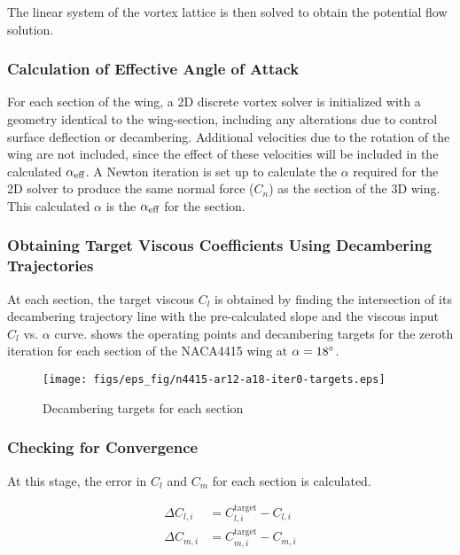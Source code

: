The linear system of the vortex lattice is then solved to obtain the potential flow solution.

\subsubsection{Calculation of Effective Angle of Attack}\label{step:aeff-calc}
For each section of the wing, a 2D discrete vortex solver is initialized with a geometry identical to the wing-section, including any alterations due to control surface deflection or decambering. Additional velocities due to the rotation of the wing are not included, since the effect of these velocities will be included in the calculated $\alpha_\text{eff}{}$.
A Newton iteration is set up to calculate the $\alpha$ required for the 2D solver to produce the same normal force ($C_n$) as the section of the 3D wing. This calculated $\alpha$ is the $\alpha_\text{eff}{}$ for the section.

\subsubsection{Obtaining Target Viscous Coefficients Using Decambering Trajectories}\label{step:traj-target}
At each section, the target viscous $C_l$ is obtained by finding the intersection of its decambering trajectory line with the pre-calculated slope and the viscous input $C_l$ vs. $\alpha$ curve.  shows the operating points and decambering targets for the zeroth iteration for each section of the NACA4415  wing at $\alpha=18^\circ{}$.

\begin{figure}[ht]
    \centering
    \texttt{[image: figs/eps\_fig/n4415-ar12-a18-iter0-targets.eps]}
    \caption{Decambering targets for each section}
    \label{fig:iter0-targets}
\end{figure}


\subsubsection{Checking for Convergence}\label{step:convergence}
At this stage, the error in $C_l$ and $C_m$ for each section is calculated.

\begin{align}
    \Delta C_{l,i} &= C_{l,i}^\text{target} - C_{l,i} \\
    \Delta C_{m,i} &= C_{m,i}^\text{target} - C_{m,i}
\end{align}

